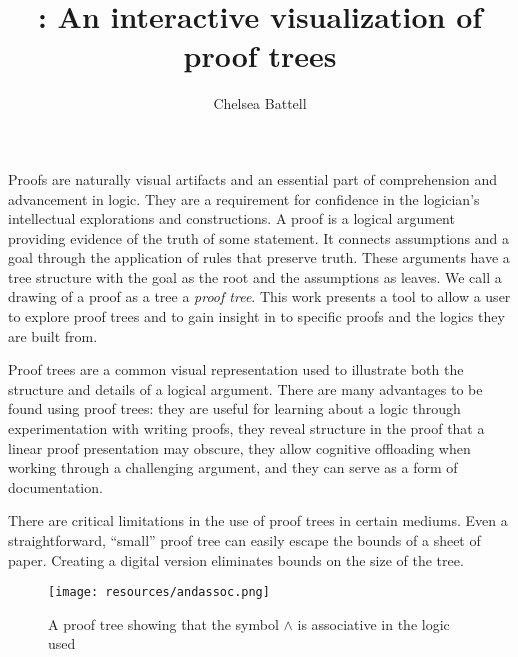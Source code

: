 \documentclass[journal]{vgtc}                %
\title{\projectname{}: An interactive visualization of proof trees}
\author{Chelsea Battell}
\begin{document}

\label{sec:intro}

\maketitle


Proofs are naturally visual artifacts and an essential part of comprehension and advancement in logic. They are a requirement for confidence in the logician's intellectual explorations and constructions. A proof is a logical argument providing evidence of the truth of some statement. It connects assumptions and a goal through the application of rules that preserve truth. These arguments have a tree structure with the goal as the root and the assumptions as leaves. We call a drawing of a proof as a tree a \textit{proof tree}. This work presents a tool to allow a user to explore proof trees and to gain insight in to specific proofs and the logics they are built from.

Proof trees are a common visual representation used to illustrate both the structure and details of a logical argument. There are many advantages to be found using proof trees: they are useful for learning about a logic through experimentation with writing proofs, they reveal structure in the proof that a linear proof presentation may obscure, they allow cognitive offloading when working through a challenging argument, and they can serve as a form of documentation.

There are critical limitations in the use of proof trees in certain mediums. Even a straightforward, ``small'' proof tree can easily escape the bounds of a sheet of paper. Creating a digital version eliminates bounds on the size of the tree.

\begin{figure}[h]
\centering
\texttt{[image: resources/andassoc.png]}
\caption{A proof tree showing that the symbol $\wedge$ is associative in the logic used}
\end{figure}
\end{document}

